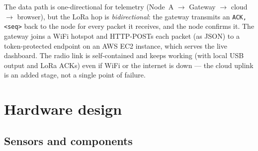 \documentclass[11pt,a4paper]{article}
\begin{document}
\begin{center}
\end{center}

The data path is one-directional for telemetry (Node~A $\rightarrow$
Gateway $\rightarrow$ cloud $\rightarrow$ browser), but the LoRa hop is
\emph{bidirectional}: the gateway transmits an \texttt{ACK,<seq>} back
to the node for every packet it receives, and the node confirms it. The
gateway joins a WiFi hotspot and HTTP-POSTs each packet (as JSON) to a
token-protected endpoint on an AWS EC2 instance, which serves the live
dashboard. The radio link is self-contained and keeps working (with
local USB output and LoRa ACKs) even if WiFi or the internet is down ---
the cloud uplink is an added stage, not a single point of failure.

\section{Hardware design}

\subsection{Sensors and components}
\end{document}
